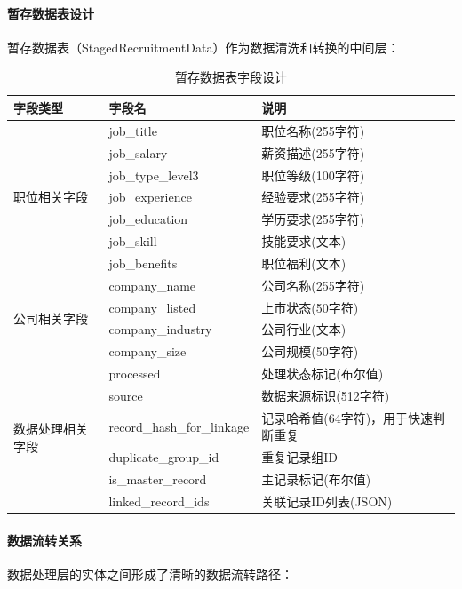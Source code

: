 \paragraph{暂存数据表设计}
暂存数据表（StagedRecruitmentData）作为数据清洗和转换的中间层：

\begin{table}[htbp]
  \centering
  \caption{暂存数据表字段设计}
  \label{tab:staged_recruitment_data_fields}
  \begin{tabular}{@{}lll@{}} 
    \toprule
    \textbf{字段类型} & \textbf{字段名} & \textbf{说明} \\ 
    \midrule
    \multirow{7}{*}{职位相关字段} 
    & job\_title & 职位名称(255字符) \\
    & job\_salary & 薪资描述(255字符) \\
    & job\_type\_level3 & 职位等级(100字符) \\
    & job\_experience & 经验要求(255字符) \\
    & job\_education & 学历要求(255字符) \\
    & job\_skill & 技能要求(文本) \\
    & job\_benefits & 职位福利(文本) \\
    \midrule
    \multirow{4}{*}{公司相关字段}
    & company\_name & 公司名称(255字符) \\
    & company\_listed & 上市状态(50字符) \\
    & company\_industry & 公司行业(文本) \\
    & company\_size & 公司规模(50字符) \\
    \midrule
    \multirow{6}{*}{数据处理相关字段}
    & processed & 处理状态标记(布尔值) \\
    & source & 数据来源标识(512字符) \\
    & record\_hash\_for\_linkage & 记录哈希值(64字符)，用于快速判断重复 \\
    & duplicate\_group\_id & 重复记录组ID \\
    & is\_master\_record & 主记录标记(布尔值) \\
    & linked\_record\_ids & 关联记录ID列表(JSON) \\
    \bottomrule
  \end{tabular}
\end{table}

\paragraph{数据流转关系}
数据处理层的实体之间形成了清晰的数据流转路径：

